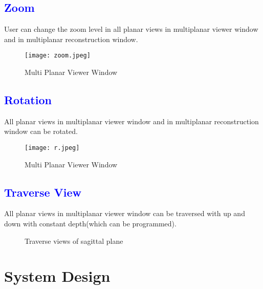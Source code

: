 \documentclass[12pt]{report}
\begin{document}
\vspace{70pt}

\section{\textcolor{blue}{Zoom} }
User can change the zoom level in all planar views in multiplanar viewer window and in multiplanar reconstruction window.

\begin{figure}[h]
\centering
\texttt{[image: zoom.jpeg]}
\caption{Multi Planar Viewer Window}
\end{figure}


\section{\textcolor{blue}{Rotation} }
All planar views in multiplanar viewer window and in multiplanar reconstruction window can be rotated.

\begin{figure}[h]
\centering
\texttt{[image: r.jpeg]}
\caption{Multi Planar Viewer Window}
\end{figure}


\vspace{200pt}

\section{\textcolor{blue}{Traverse View} }
All planar views in multiplanar viewer window can be traversed with up and down with constant depth(which can be programmed).

\begin{figure}[h]
\centering
{}
\end{figure}

\begin{figure}[h]
\centering
{}
\caption{Traverse views of sagittal plane}
\end{figure}

\chapter{System Design}
\end{document}
